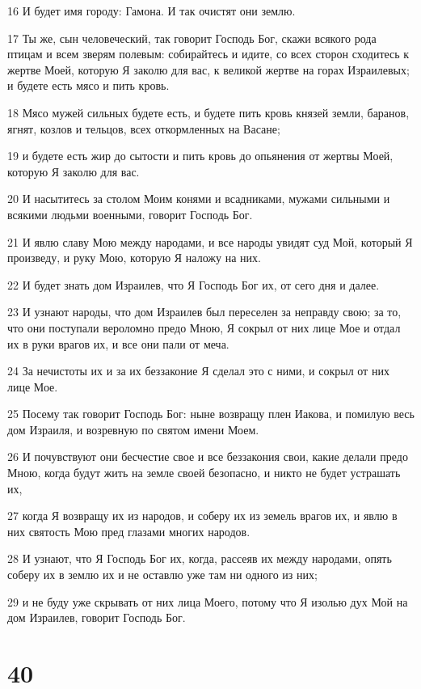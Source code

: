\par 16 И будет имя городу: Гамона. И так очистят они землю.
\par 17 Ты же, сын человеческий, так говорит Господь Бог, скажи всякого рода птицам и всем зверям полевым: собирайтесь и идите, со всех сторон сходитесь к жертве Моей, которую Я заколю для вас, к великой жертве на горах Израилевых; и будете есть мясо и пить кровь.
\par 18 Мясо мужей сильных будете есть, и будете пить кровь князей земли, баранов, ягнят, козлов и тельцов, всех откормленных на Васане;
\par 19 и будете есть жир до сытости и пить кровь до опьянения от жертвы Моей, которую Я заколю для вас.
\par 20 И насытитесь за столом Моим конями и всадниками, мужами сильными и всякими людьми военными, говорит Господь Бог.
\par 21 И явлю славу Мою между народами, и все народы увидят суд Мой, который Я произведу, и руку Мою, которую Я наложу на них.
\par 22 И будет знать дом Израилев, что Я Господь Бог их, от сего дня и далее.
\par 23 И узнают народы, что дом Израилев был переселен за неправду свою; за то, что они поступали вероломно предо Мною, Я сокрыл от них лице Мое и отдал их в руки врагов их, и все они пали от меча.
\par 24 За нечистоты их и за их беззаконие Я сделал это с ними, и сокрыл от них лице Мое.
\par 25 Посему так говорит Господь Бог: ныне возвращу плен Иакова, и помилую весь дом Израиля, и возревную по святом имени Моем.
\par 26 И почувствуют они бесчестие свое и все беззакония свои, какие делали предо Мною, когда будут жить на земле своей безопасно, и никто не будет устрашать их,
\par 27 когда Я возвращу их из народов, и соберу их из земель врагов их, и явлю в них святость Мою пред глазами многих народов.
\par 28 И узнают, что Я Господь Бог их, когда, рассеяв их между народами, опять соберу их в землю их и не оставлю уже там ни одного из них;
\par 29 и не буду уже скрывать от них лица Моего, потому что Я изолью дух Мой на дом Израилев, говорит Господь Бог.

\chapter{40}

